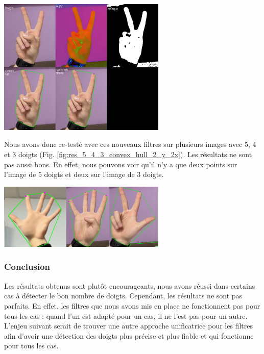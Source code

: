 \documentclass[11pt]{article}
\begin{document}
\begin{center}
    \includegraphics[width=0.6\textwidth]{images/res_2_convex_hull_filter_2_y_2_x.png}
    \label{fig:res_2_convex_hull_filter_2_y_2_x}
\end{center}
\newpage
Nous avons donc re-testé avec ces nouveaux filtres sur plusieurs images avec 5, 4 et 3 doigts (Fig. \ref{fig:res_5_4_3_convex_hull_2_y_2x}). Les résultats ne sont pas aussi bons. En effet, nous pouvons voir qu'il n'y a que deux points sur l'image de 5 doigts et deux sur l'image de 3 doigts.
\begin{center}
    \includegraphics[width=0.6\textwidth]{images/res_5_4_3_convex_hull_2_y_2x.png}
    \label{fig:res_5_4_3_convex_hull_2_y_2x}
\end{center}

\subsubsection{Conclusion}
Les résultats obtenus sont plutôt encourageants, nous avons réussi dans certains cas à détecter le bon nombre de doigts. Cependant, les résultats ne sont pas parfaits. En effet, les filtres que nous avons mis en place ne fonctionnent pas pour tous les cas : quand l'un est adapté pour un cas, il ne l'est pas pour un autre. L'enjeu suivant serait de trouver une autre approche unificatrice pour les filtres afin d'avoir une détection des doigts plus précise et plus fiable et qui fonctionne pour tous les cas.
\end{document}
